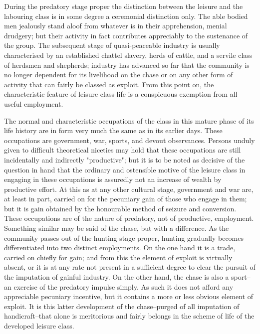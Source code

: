 \documentclass[12pt]{report}
\begin{document}
During the predatory stage proper the distinction between the leisure
and the labouring class is in some degree a ceremonial distinction only.
The able bodied men jealously stand aloof from whatever is in their
apprehension, menial drudgery; but their activity in fact contributes
appreciably to the sustenance of the group. The subsequent stage of
quasi-peaceable industry is usually characterised by an established
chattel slavery, herds of cattle, and a servile class of herdsmen and
shepherds; industry has advanced so far that the community is no longer
dependent for its livelihood on the chase or on any other form of
activity that can fairly be classed as exploit. From this point on, the
characteristic feature of leisure class life is a conspicuous exemption
from all useful employment.

The normal and characteristic occupations of the class in this mature
phase of its life history are in form very much the same as in its
earlier days. These occupations are government, war, sports, and devout
observances. Persons unduly given to difficult theoretical niceties
may hold that these occupations are still incidentally and indirectly
"productive"; but it is to be noted as decisive of the question in hand
that the ordinary and ostensible motive of the leisure class in
engaging in these occupations is assuredly not an increase of wealth by
productive effort. At this as at any other cultural stage, government
and war are, at least in part, carried on for the pecuniary gain of
those who engage in them; but it is gain obtained by the honourable
method of seizure and conversion. These occupations are of the nature of
predatory, not of productive, employment. Something similar may be said
of the chase, but with a difference. As the community passes out of the
hunting stage proper, hunting gradually becomes differentiated into two
distinct employments. On the one hand it is a trade, carried on chiefly
for gain; and from this the element of exploit is virtually absent,
or it is at any rate not present in a sufficient degree to clear the
pursuit of the imputation of gainful industry. On the other hand, the
chase is also a sport--an exercise of the predatory impulse simply.
As such it does not afford any appreciable pecuniary incentive, but it
contains a more or less obvious element of exploit. It is this latter
development of the chase--purged of all imputation of handicraft--that
alone is meritorious and fairly belongs in the scheme of life of the
developed leisure class.
\end{document}
